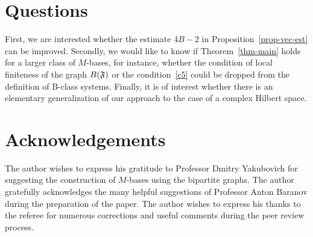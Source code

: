 \documentclass[12pt,oneside,a4paper]{amsart}
\begin{document}
  \section{Questions}
    First, we are interested whether the estimate $4B - 2$ in Proposition~\eqref{prop-vec-est} can be improved.
    Secondly, we would like to know if Theorem~\ref{thm-main} holds for a larger class of $M$-bases, for instance, whether the condition of
      local finiteness of the graph $B(\mathfrak{F})$ or the condition~\ref{c5} could be dropped from the definition of B-class systems.
    Finally, it is of interest whether there is an elementary generalization of our approach to the case of a complex Hilbert space.

  \bigskip
  \section{Acknowledgements}
    The author wishes to express his gratitude to Professor Dmitry Yakubovich for suggesting
      the construction of $M$-bases using the bipartite graphs.
    The author gratefully acknowledges the many helpful suggestions of
      Professor Anton Baranov during the preparation of the paper.
    The author wishes to express his thanks to the referee for numerous corrections and useful comments during
      the peer review process.
\end{document}
